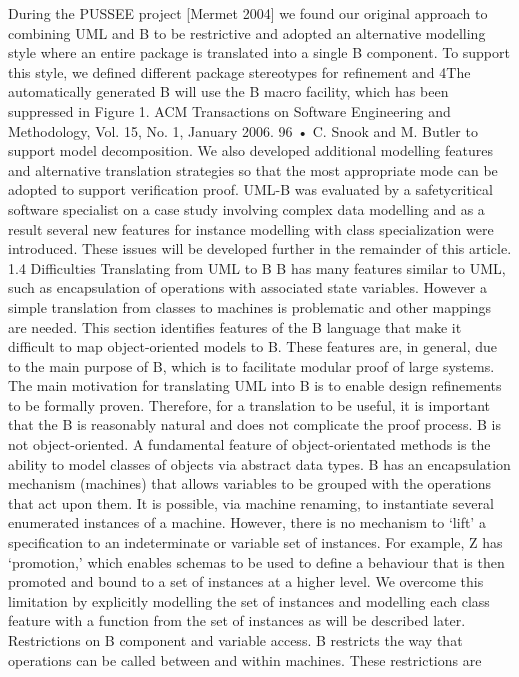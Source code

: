 During the PUSSEE project [Mermet 2004] we found our original approach
to combining UML and B to be restrictive and adopted an alternative modelling style where an entire package is translated into a single B component. To
support this style, we defined different package stereotypes for refinement and
4The automatically generated B will use the B macro facility, which has been suppressed in Figure 1.
ACM Transactions on Software Engineering and Methodology, Vol. 15, No. 1, January 2006.
96 • C. Snook and M. Butler
to support model decomposition. We also developed additional modelling features and alternative translation strategies so that the most appropriate mode
can be adopted to support verification proof. UML-B was evaluated by a safetycritical software specialist on a case study involving complex data modelling and
as a result several new features for instance modelling with class specialization
were introduced. These issues will be developed further in the remainder of this
article.
1.4 Difficulties Translating from UML to B
B has many features similar to UML, such as encapsulation of operations with
associated state variables. However a simple translation from classes to machines is problematic and other mappings are needed. This section identifies
features of the B language that make it difficult to map object-oriented models
to B. These features are, in general, due to the main purpose of B, which is to
facilitate modular proof of large systems. The main motivation for translating
UML into B is to enable design refinements to be formally proven. Therefore,
for a translation to be useful, it is important that the B is reasonably natural
and does not complicate the proof process.
B is not object-oriented. A fundamental feature of object-orientated methods is the ability to model classes of objects via abstract data types. B has
an encapsulation mechanism (machines) that allows variables to be grouped
with the operations that act upon them. It is possible, via machine renaming,
to instantiate several enumerated instances of a machine. However, there is
no mechanism to ‘lift’ a specification to an indeterminate or variable set of
instances. For example, Z has ‘promotion,’ which enables schemas to be used
to define a behaviour that is then promoted and bound to a set of instances
at a higher level. We overcome this limitation by explicitly modelling the set
of instances and modelling each class feature with a function from the set of
instances as will be described later.
Restrictions on B component and variable access. B restricts the way that
operations can be called between and within machines. These restrictions are
